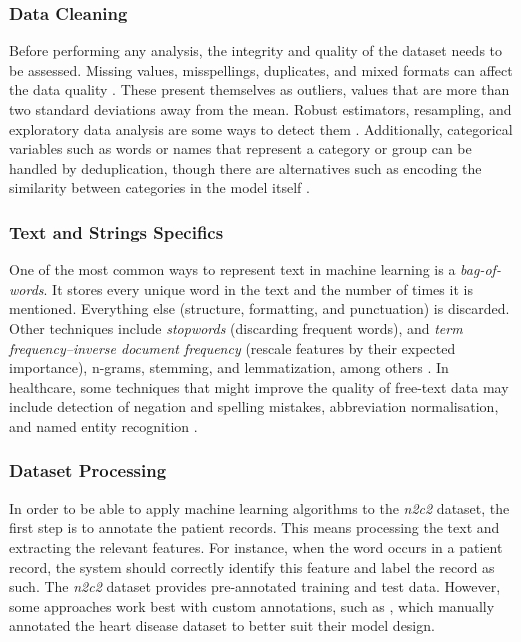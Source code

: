 \documentclass[a4paper,11pt]{article}
\begin{document}
\subsubsection{Data Cleaning}

Before performing any analysis, the integrity and quality of the dataset needs
to be assessed.
Missing values, misspellings, duplicates, and mixed formats can affect the
data quality \parencite{Chu2016}.
These present themselves as outliers, values that are more than two standard
deviations away from the mean.
Robust estimators, resampling, and exploratory data analysis are some ways to
detect them \parencite{Hellerstein2008}.
Additionally, categorical variables such as words or names that represent a
category or group can be handled by deduplication,
though there are alternatives such as encoding the similarity between
categories in the model itself \parencite{Cerda2018}.

\subsubsection{Text and Strings Specifics}

One of the most common ways to represent text in machine learning is a
\textit{bag-of-words}.
It stores every unique word in the text and the number of times it is mentioned.
Everything else (structure, formatting, and punctuation) is discarded.
Other techniques include \textit{stopwords} (discarding frequent words),
and \textit{term frequency–inverse document frequency}
(rescale features by their expected importance), n-grams,
stemming, and lemmatization, among others \parencite[327,344]{Mueller2017}.
In healthcare, some techniques that might improve the quality of free-text data
may include detection of negation and spelling mistakes, abbreviation normalisation,
and named entity recognition \parencite{Dalianis2015}.

\subsubsection{Dataset Processing}

In order to be able to apply machine learning algorithms to the \textit{n2c2}
dataset, the first step is to annotate the patient records.
This means processing the text and extracting the relevant features.
For instance, when the word  occurs in a patient record,
the system should correctly identify this feature and label the record as such.
The \textit{n2c2} dataset provides pre-annotated training and test data.
However, some approaches work best with custom annotations, such as
\textcite{Roberts2014}, which manually annotated the heart disease dataset to
better suit their model design.
\end{document}
